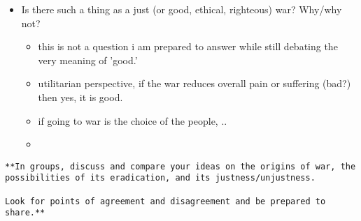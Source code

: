 \documentclass[letterpaper]{article}
\begin{document}
\begin{itemize}
\item Is there such a thing as a just (or good, ethical, righteous) war?
Why/why not?

\begin{itemize}
\item this is not a question i am prepared to answer while still debating
the very meaning of 'good.'
\item utilitarian perspective, if the war reduces overall pain or
suffering (bad?) then yes, it is good.
\item if going to war is the choice of the people, ..
\item 
\end{itemize}
\end{itemize}

\begin{verbatim}
**In groups, discuss and compare your ideas on the origins of war, the possibilities of its eradication, and its justness/unjustness. 

Look for points of agreement and disagreement and be prepared to share.**
\end{verbatim}
\end{document}
